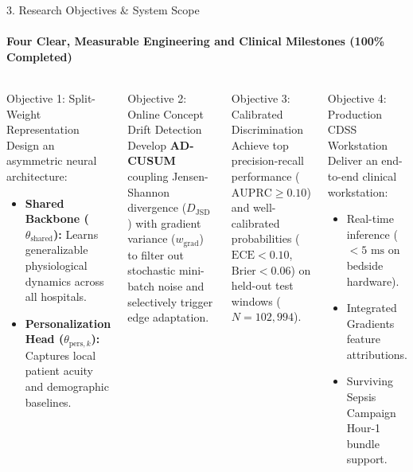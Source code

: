 \documentclass[aspectratio=169, 10pt]{beamer}
\begin{document}
\begin{frame}{3. Research Objectives \& System Scope}
    \framesubtitle{Four Clear, Measurable Engineering and Clinical Milestones (100\% Completed)}
    \begin{columns}[T]
        \begin{block}{Objective 1: Split-Weight Representation}
            \scriptsize
            Design an asymmetric neural architecture:
            \begin{itemize}
                \item \textbf{Shared Backbone ($\theta_{\text{shared}}$):} Learns generalizable physiological dynamics across all hospitals.
                \item \textbf{Personalization Head ($\theta_{\text{pers}, k}$):} Captures local patient acuity and demographic baselines.
            \end{itemize}
        \end{block}
        
        \begin{block}{Objective 2: Online Concept Drift Detection}
            \scriptsize
            Develop \textbf{AD-CUSUM} coupling Jensen-Shannon divergence ($D_{\mathrm{JSD}}$) with gradient variance ($w_{\mathrm{grad}}$) to filter out stochastic mini-batch noise and selectively trigger edge adaptation.
        \end{block}

        \begin{block}{Objective 3: Calibrated Discrimination}
            \scriptsize
            Achieve top precision-recall performance ($\text{AUPRC} \ge 0.10$) and well-calibrated probabilities ($\text{ECE} < 0.10$, $\text{Brier} < 0.06$) on held-out test windows ($N = 102,994$).
        \end{block}

        \begin{block}{Objective 4: Production CDSS Workstation}
            \scriptsize
            Deliver an end-to-end clinical workstation:
            \begin{itemize}
                \item Real-time inference ($< 5\text{ ms}$ on bedside hardware).
                \item Integrated Gradients feature attributions.
                \item Surviving Sepsis Campaign Hour-1 bundle support.
            \end{itemize}
        \end{block}
    \end{columns}
\end{frame}
\end{document}
